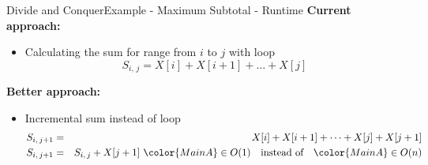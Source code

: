 \begin{frame}{Divide and Conquer}{Example - Maximum Subtotal - Runtime}
  \textbf{Current approach:}
  \begin{itemize}
    \item<2->
      Calculating the sum for range from $i$ to $j$ with loop
      \begin{displaymath}
        S_{i,\,j} = X[i] + X[i+1] + \dots + X[j]
      \end{displaymath}
  \end{itemize}
   \textbf{Better approach:}
   \begin{itemize}
    \item<4->
      Incremental sum instead of loop
      \begin{eqnarray*}
        S_{i,\,j+1} &=& X[i] + X[i+1] + \dots + X[j] + X[j+1]\\
        S_{i,\,j+1} &=& S_{i,\,j} + X[j+1]
        ~{\color{MainA}\in O(1)}\hspace{1em}
          \text{instead of}\hspace{1em} {\color{MainA}\in O(n)}
      \end{eqnarray*}
  \end{itemize}
\end{frame}





